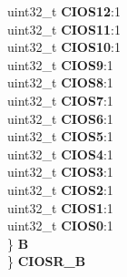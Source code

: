 \begin{DoxyCompactItemize}
\begin{tabbing}
\>\>uint32\_t {\bfseries CIOS12}:1\\
\>\>uint32\_t {\bfseries CIOS11}:1\\
\>\>uint32\_t {\bfseries CIOS10}:1\\
\>\>uint32\_t {\bfseries CIOS9}:1\\
\>\>uint32\_t {\bfseries CIOS8}:1\\
\>\>uint32\_t {\bfseries CIOS7}:1\\
\>\>uint32\_t {\bfseries CIOS6}:1\\
\>\>uint32\_t {\bfseries CIOS5}:1\\
\>\>uint32\_t {\bfseries CIOS4}:1\\
\>\>uint32\_t {\bfseries CIOS3}:1\\
\>\>uint32\_t {\bfseries CIOS2}:1\\
\>\>uint32\_t {\bfseries CIOS1}:1\\
\>\>uint32\_t {\bfseries CIOS0}:1\\
\>\} {\bfseries B}\\
\} {\bfseries CIOSR\_B}\\


\end{tabbing}
\end{DoxyCompactItemize}

